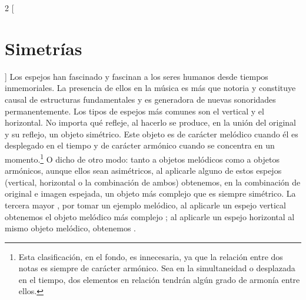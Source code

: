 \documentclass[a4paper,11pt]{article}
\begin{document}
\newpage
\begin{multicols}{2}
[\section{Simetrías}\label{sec:simetrias}]
Los espejos han fascinado y fascinan a los seres humanos desde tiempos inmemoriales. La presencia de ellos en la música es más que notoria y constituye causal de estructuras fundamentales y es generadora de nuevas sonoridades permanentemente.  Los tipos de espejos más comunes son el vertical y el horizontal. No importa qué refleje, al hacerlo se produce, en la unión del original y su reflejo, un objeto simétrico. Este objeto es de carácter melódico cuando él es desplegado en el tiempo y de carácter armónico cuando se concentra en un momento.\footnote{Esta clasificación, en el fondo, es innecesaria, ya que la relación entre dos notas es siempre de carácter armónico. Sea en la simultaneidad o desplazada en el tiempo, dos elementos en relación tendrán algún grado de armonía entre ellos.} O dicho de otro modo: tanto a objetos melódicos como a objetos armónicos, aunque ellos sean asimétricos, al aplicarle alguno de estos espejos (vertical, horizontal o la combinación de ambos) obtenemos, en la combinación de original e imagen espejada, un objeto más complejo que es siempre simétrico. La tercera mayor \hbox{,} por tomar un ejemplo melódico, al aplicarle un espejo vertical obtenemos el objeto melódico más complejo \hbox{;} al aplicarle un espejo horizontal al mismo objeto melódico, obtenemos \hbox{.}


\end{multicols}
\end{document}
